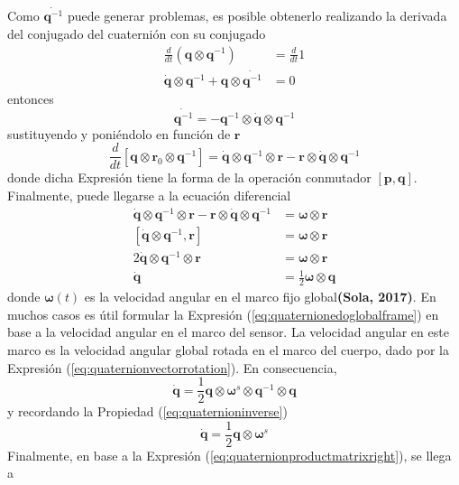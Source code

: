 Como $\dot{\bm{q}^{-1}}$ puede generar problemas, es posible obtenerlo realizando la derivada del conjugado del cuaternión con su conjugado
\begin{align}
    \frac{d}{dt}\left(\bm{q}\otimes\bm{q}^{-1}\right) &= \frac{d}{dt}1 \\
    \dot{\bm{q}}\otimes\bm{q}^{-1} + \bm{q}\otimes\dot{\bm{q}^{-1}} &= 0
\end{align}
entonces
\begin{equation}
    \dot{\bm{q}^{-1}} = -\bm{q}^{-1}\otimes\dot{\bm{q}}\otimes\bm{q}^{-1}
\end{equation}
sustituyendo y poniéndolo en función de $\bm{r}$
\begin{equation}
        \frac{d}{dt}\left[\bm{q}\otimes\bm{r}_0\otimes\bm{q}^{-1}\right] = \dot{\bm{q}}\otimes\bm{q}^{-1}\otimes\bm{r} - \bm{r}\otimes\dot{\bm{q}}\otimes\bm{q}^{-1}
\end{equation}
donde dicha Expresión tiene la forma de la operación conmutador $\left[\bm{p},\bm{q}\right]$. Finalmente, puede llegarse a la ecuación diferencial
\begin{align}
    \dot{\bm{q}}\otimes\bm{q}^{-1}\otimes\bm{r} - \bm{r}\otimes\dot{\bm{q}}\otimes\bm{q}^{-1} &= \bm{\omega}\otimes\bm{r} \\
    \left[\dot{\bm{q}}\otimes\bm{q}^{-1},\bm{r}\right] &= \bm{\omega}\otimes\bm{r} \\
    2\dot{\bm{q}}\otimes\bm{q}^{-1}\otimes\bm{r} &= \bm{\omega}\otimes\bm{r} \\
    \dot{\bm{q}} &= \frac{1}{2}\bm{\omega}\otimes\bm{q}
    \label{eq:quaternionedoglobalframe}
\end{align}
donde $\bm{\omega}(t)$ es la velocidad angular en el marco fijo global\textbf{(Sola, 2017)}. En muchos casos es útil formular la Expresión (\ref{eq:quaternionedoglobalframe}) en base a la velocidad angular en el marco del sensor. La velocidad angular en este marco es la velocidad angular global rotada en el marco del cuerpo, dado por la Expresión (\ref{eq:quaternionvectorrotation}). En consecuencia,
\begin{equation}
    \dot{\bm{q}} = \frac{1}{2}\bm{q}\otimes\bm{\omega}^s\otimes\bm{q}^{-1}\otimes\bm{q}
\end{equation}
y recordando la Propiedad (\ref{eq:quaternioninverse})
\begin{equation}
    \dot{\bm{q}} = \frac{1}{2}\bm{q}\otimes\bm{\omega}^s 
\end{equation}
Finalmente, en base a la Expresión (\ref{eq:quaternionproductmatrixright}), se llega a
